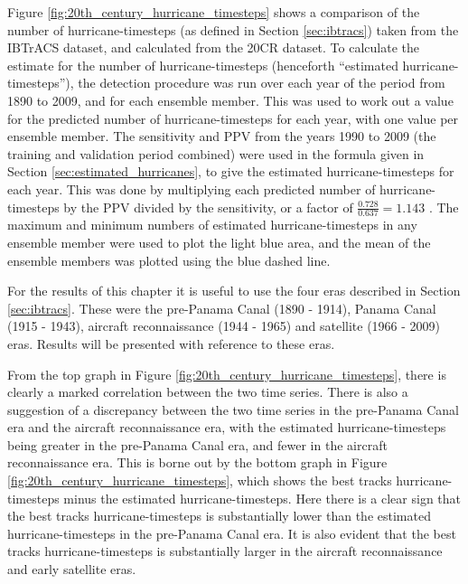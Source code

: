 \documentclass[pdftex,12pt,a4paper]{report}
\begin{document}
Figure \ref{fig:20th_century_hurricane_timesteps} shows a comparison of the number of
hurricane-timesteps (as defined in Section \ref{sec:ibtracs}) taken from the IBTrACS dataset, and
calculated from the 20CR dataset. To calculate the estimate for the number of hurricane-timesteps
(henceforth ``estimated hurricane-timesteps''), the detection procedure was run over each year of
the period from 1890 to 2009, and for each ensemble member. This was used to work out a value for
the predicted number of hurricane-timesteps for each year, with one value per ensemble member. The
sensitivity and PPV from the years 1990 to 2009 (the training and validation period combined) were
used in the formula given in Section \ref{sec:estimated_hurricanes}, to give the estimated
hurricane-timesteps for each year. This was done by multiplying each predicted number of
hurricane-timesteps by the PPV divided by the sensitivity, or a factor of $\frac{0.728}{0.637} =
1.143$ . The maximum and minimum numbers of estimated hurricane-timesteps in any ensemble member
were used to plot the light blue area, and the mean of the ensemble members was plotted using the
blue dashed line.

For the results of this chapter it is useful to use the four eras described in Section
\ref{sec:ibtracs}. These were the pre-Panama Canal (1890 - 1914), Panama Canal (1915 - 1943),
aircraft reconnaissance (1944 - 1965) and satellite (1966 - 2009) eras. Results will be presented
with reference to these eras.

From the top graph in Figure \ref{fig:20th_century_hurricane_timesteps}, there is clearly a marked
correlation between the two time series. There is also a suggestion of a discrepancy between the two
time series in the pre-Panama Canal era and the aircraft reconnaissance era, with the estimated
hurricane-timesteps being greater in the pre-Panama Canal era, and fewer in the
aircraft reconnaissance era. This is borne out by the bottom graph in Figure 
\ref{fig:20th_century_hurricane_timesteps}, which shows the best tracks hurricane-timesteps minus the
estimated hurricane-timesteps. Here there is a clear sign that the best tracks hurricane-timesteps
is substantially lower than the estimated hurricane-timesteps in the pre-Panama Canal era. It is
also evident that the best tracks hurricane-timesteps is substantially larger in the aircraft
reconnaissance and early satellite eras.
\end{document}
